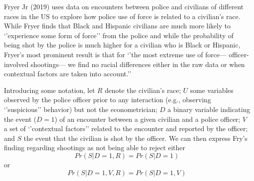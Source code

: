 \documentclass[11pt]{exam}
\begin{document}
Fryer Jr (2019) uses data on encounters between police and civilians of
different races in the US to explore how police use of force is related
to a civilian's race. While Fryer finds that Black and Hispanic
civilians are much more likely to `'experience some form of force'' from
the police and while the probability of being shot by the police is much
higher for a civilian who is Black or Hispanic, Fryer's most prominent
result is that for `'the most extreme use of force--- officer-involved
shootings--- we find no racial differences either in the raw data or
when contextual factors are taken into account.''

Introducing some notation, let \(R\) denote the civilian's race; \(U\)
some variables observed by the police officer prior to any interaction
(e.g., observing `'suspicious'' behavior) but not the econometrician;
\(D\) a binary variable indicating the event (\(D = 1\)) of an encounter
between a given civilian and a police officer; \(V\) a set of
`'contextual factors'' related to the encounter and reported by the
officer; and \(S\) the event that the civilian is shot by the officer.
We can then express Fry's finding regarding shootings as not being able
to reject either
\begin{equation}
Pr(S | D = 1, R) = Pr(S | D = 1)
\end{equation}
or
\begin{equation}
Pr(S | D = 1,V,R) = Pr(S | D = 1,V)
\end{equation}
\end{document}
